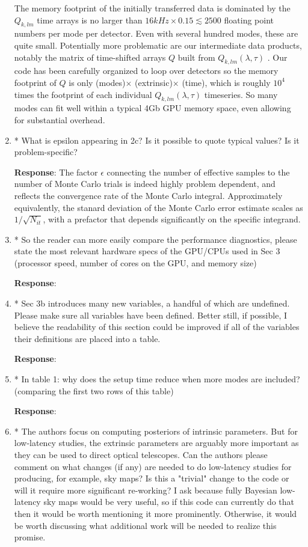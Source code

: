 \documentclass[onecolumn]{revtex4}
\begin{document}
\begin{enumerate}
The memory footprint of the initially transferred data is dominated by the $Q_{k,lm}$ time arrays is no larger than $16 kHz
\times 0.15  \lesssim 2500$ floating point numbers per mode per detector.  Even with several hundred modes, these are
quite small.
Potentially more problematic are our intermediate data products, notably the matrix of time-shifted arrays $Q$ built
from $Q_{k,lm}(\lambda,\tau)$ .  Our code has been carefully
organized to loop over detectors so the memory footprint of $Q$ is only (modes)$\times$ (extrinsic)$\times$ (time),
which is roughly $10^4$ times the footprint of each individual $Q_{k,lm}(\lambda,\tau)$ timeseries.  So many modes can
fit well within a typical 4Gb GPU memory space, even allowing for substantial overhead.


\item * What is epsilon appearing in 2c? Is it possible to quote typical
values? Is it problem-specific?


\noindent \textbf{Response}:   The factor $\epsilon$ connecting the number of effective samples to the number of Monte
Carlo trials is indeed highly problem dependent, and reflects the convergence rate of the Monte Carlo integral.
Approximately equivalently, the stanard deviation of the Monte Carlo error estimate scales as $1/\sqrt{N_{it}}$, with a
prefactor that  depends significantly on the specific integrand.


\item * So the reader can more easily compare the performance diagnostics,
please state the most relevant hardware specs of the GPU/CPUs used in
Sec 3 (processor speed, number of cores on the GPU, and memory size)

\noindent \textbf{Response}:

\item * Sec 3b introduces many new variables, a handful of which are
undefined. Please make sure all variables have been defined. Better
still, if possible, I believe the readability of this section could be
improved if all of the variables their definitions are placed into a
table.

\noindent \textbf{Response}:

\item * In table 1: why does the setup time reduce when more modes are
included? (comparing the first two rows of this table)

\noindent \textbf{Response}:

\item * The authors focus on computing posteriors of intrinsic parameters.
But for low-latency studies, the extrinsic parameters are arguably
more important as they can be used to direct optical telescopes. Can
the authors please comment on what changes (if any) are needed to do
low-latency studies for producing, for example, sky maps? Is this a
"trivial" change to the code or will it require more significant
re-working? I ask because fully Bayesian low-latency sky maps would be
very useful, so if this code can currently do that then it would be
worth mentioning it more prominently. Otherwise, it would be worth
discussing what additional work will be needed to realize this
promise.


\end{enumerate}
\end{document}
